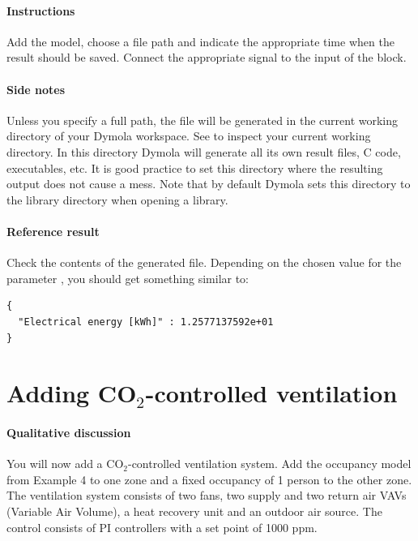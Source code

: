 \documentclass[10pt,a4paper]{article}
\begin{document}
\paragraph{Instructions}
Add the model, choose a file path and indicate the appropriate time when 
the result should be saved.
Connect the appropriate signal to the input of the block.

\paragraph{Side notes}
Unless you specify a full path, the file will be generated in
the current working directory of your Dymola workspace.
See  to inspect your current
working directory.
In this directory Dymola will generate all its own result files, C code, executables, etc.
It is good practice to set this directory where the resulting output does not cause a mess.
Note that by default Dymola sets this directory to the library directory when opening a library.

\paragraph{Reference result}
Check the contents of the generated file. 
Depending on the chosen value for the parameter , 
you should get something similar to:
\begin{verbatim}
{
  "Electrical energy [kWh]" : 1.2577137592e+01
}

\end{verbatim}


\section{Adding CO$_2$-controlled ventilation}
\paragraph{Qualitative discussion}
You will now add a CO$_2$-controlled ventilation system.
Add the occupancy model from Example 4 to one zone
and a fixed occupancy of 1 person to the other zone.
The ventilation system consists of two fans, two supply and two return air
VAVs (Variable Air Volume), a heat recovery unit and an outdoor air source.
The control consists of PI controllers with a set point of 1000 ppm.
\end{document}
